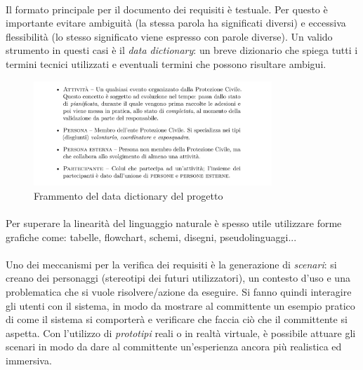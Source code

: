 \documentclass[11pt,a4paper,english]{article}
\begin{document}
\paragraph{} Il formato principale per il documento dei requisiti è testuale. Per questo è importante evitare ambiguità (la stessa parola ha significati diversi) e eccessiva flessibilità (lo stesso significato viene espresso con parole diverse). Un valido strumento in questi casi è il \emph{data dictionary}: un breve dizionario che spiega tutti i termini tecnici utilizzati e eventuali termini che possono risultare ambigui. 


\begin{figure}[H]
    \centering
    \includegraphics[width=0.8\textwidth]{img/data_dictionary.png}
    \caption{Frammento del data dictionary del progetto}
\end{figure}


\paragraph{} Per superare la linearità del linguaggio naturale è spesso utile utilizzare forme grafiche come: tabelle, flowchart, schemi, disegni, pseudolinguaggi... 

\paragraph{} Uno dei meccanismi per la verifica dei requisiti è la generazione di \emph{scenari}: si creano dei personaggi (stereotipi dei futuri utilizzatori), un contesto d'uso e una problematica che si vuole risolvere/azione da eseguire. Si fanno quindi interagire gli utenti con il sistema, in modo da mostrare al committente un esempio pratico di come il sistema si comporterà e verificare che faccia ciò che il committente si aspetta. Con l'utilizzo di \emph{prototipi} reali o in realtà virtuale, è possibile attuare gli scenari in modo da dare al committente un'esperienza ancora più realistica ed immersiva.
\end{document}
